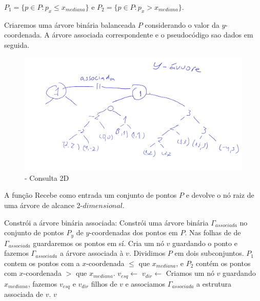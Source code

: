     $P_1 = \{p \in P : p_x \leq x_{mediana}\}$ e $P_2 = \{p \in P : p_x > x_{mediana}\}$.

Criaremos uma árvore binária balanceada \tau $P$  considerando o valor da $y$-coordenada.
A árvore associada correspondente e o pseudocódigo sao dados em seguida.


\begin{figure}[htb]
    \caption{\label{fig:Fig_16} - Consulta 2D}
    \begin{center}
        \includegraphics[width=\textwidth]{images/assoc_tree.pdf}
    \end{center}
\end{figure}


\begin{algorithm}[H]
    \caption{A função  Recebe como entrada um conjunto de pontos 
    $P$ e devolve o nó raiz de uma árvore de alcance 2-$dimensional$.}
    \begin{algorithmic}[1]
        \State Constrói a árvore binária associada: Constrói uma árvore binária $\Gamma_{associada}$ no conjunto de pontos
        $P_y$  de $y$-coordenadas dos pontos em $P$. Nas folhas de de $\Gamma_{associada}$ guardaremos
        os pontos em sí.
            \State Cria um nó $v$ guardando o ponto e fazemos $\Gamma_{associada}$ a árvore associada 
            à $v$.
        \Else
            \State Dividimos $P$ em dois subconjuntos. $P_1$ contem os pontos com a $x$-coordenada $\leq$
            que $x_{mediana}$, e $P_2$ contém os pontos com $x$-coordenada $>$ que $x_{mediana}$.
            \State $v_{esq} \leftarrow $ 
            \State $v_{dir} \leftarrow $ 
            \State Criamos um nó $v$ guardando $x_{mediana}$, fazemos $v_{esq}$ e $v_{dir}$ filhos de 
            $v$ e associamos $\Gamma_{associada}$ a estrutura associada de $v$.
        \EndIf
    \Return $v$
    \EndFunction
    \end{algorithmic}
\end{algorithm}

